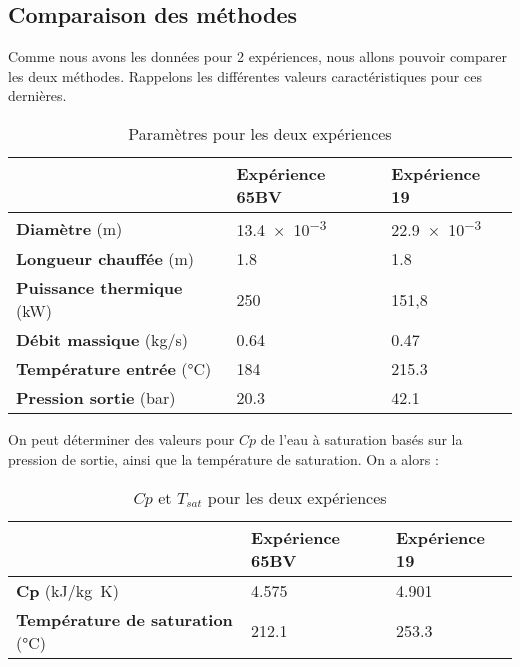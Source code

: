 \subsection{Comparaison des méthodes}
Comme nous avons les données pour 2 expériences, nous allons pouvoir comparer les deux méthodes.
Rappelons les différentes valeurs caractéristiques pour ces dernières.
\begin{table}[H]
\caption{Paramètres pour les deux expériences}
\vspace{5pt}
    \centering
    \begin{tabular}{@{}lll@{}}
        \toprule
               & \textbf{Expérience 65BV}& \textbf{Expérience 19}\\
        \midrule
          \textbf{Diamètre} (\si{m}) & \num{13.4e-3} & \num{22.9e-3} \\
          \textbf{Longueur chauffée} (\si{m}) & 1.8 & 1.8 \\
          \textbf{Puissance thermique} (\si{kW}) & 250 & 151,8 \\
          \textbf{Débit massique} (\si{kg/s})& \num{0,64} & \num{0.47} \\
          \textbf{Température entrée} (\si{\celsius})& 184 & 215.3 \\
          \textbf{Pression sortie} (\si{bar})& 20.3 & 42.1 \\
        \bottomrule  
    \end{tabular}
    \label{donnes}
\end{table}

On peut déterminer des valeurs pour $Cp$ de l'eau à saturation basés sur la pression de sortie, ainsi que la température de saturation. On a alors :
\begin{table}[H]
\caption{$Cp$ et $T_{sat}$ pour les deux expériences}
\vspace{5pt}
    \centering
    \begin{tabular}{@{}lll@{}}
        \toprule
               & \textbf{Expérience 65BV}& \textbf{Expérience 19}\\
        \midrule
          \textbf{Cp} (\si{kJ/kg K}) & \num{4.575} & \num{4,901} \\
          \textbf{Température de saturation} (\si{\celsius}) & 212.1 & 253.3 \\
        \bottomrule  
    \end{tabular}
    \label{donnes}
\end{table}

